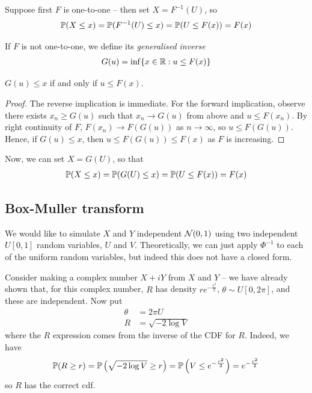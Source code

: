 \documentclass{../template/note}
\begin{document}
    Suppose first \(F\) is one-to-one -- then set \(X = F^{-1}(U)\), so
    \begin{align*}
        \mathbb P(X \leq x) = \mathbb P(F^{-1}(U) \leq x) = \mathbb P(U \leq F(x)) = F(x)
    \end{align*}
    
    If \(F\) is not one-to-one, we define its \emph{generalised inverse}
    \begin{align*}
        G(u) = \inf\{x \in \mathbb R: u \leq F(x)\}
    \end{align*}
    
    \begin{lemma}
        \(G(u) \leq x\) if and only if \(u \leq F(x)\).
    \end{lemma}
    
    \begin{proof}
        The reverse implication is immediate. For the forward implication, observe there exists \(x_n \geq G(u)\) such that \(x_n \to G(u)\) from above and \(u \leq F(x_n)\). By right continuity of \(F\), \(F(x_n) \to F(G(u))\) as \(n \to \infty\), so \(u \leq F(G(u))\). Hence, if \(G(u) \leq x\), then \(u \leq F(G(u)) \leq F(x)\) as \(F\) is increasing.
    \end{proof}
    
    Now, we can set \(X = G(U)\), so that
    \begin{align*}
        \mathbb P(X \leq x) = \mathbb P(G(U) \leq x) = \mathbb P(U \leq F(x)) = F(x)
    \end{align*}

    \subsection{Box-Muller transform}

    We would like to simulate \(X\) and \(Y\) independent \(\mathcal{N}(0, 1)\) using two independent \(U[0, 1]\) random variables, \(U\) and \(V\). Theoretically, we can just apply \(\Phi^{-1}\) to each of the uniform random variables, but indeed this does not have a closed form.

    Consider making a complex number \(X+iY\) from \(X\) and \(Y\) -- we have already shown that, for this complex number, \(R\) has density \(re^{-\frac{r^2}{2}}\), \(\theta \sim U[0, 2\pi]\), and these are independent. Now put
    \begin{align*}
        \theta &= 2\pi U \\
        R &= \sqrt{-2 \log V}
    \end{align*}
    where the \(R\) expression comes from the inverse of the CDF for \(R\). Indeed, we have
    \begin{align*}
        \mathbb P(R \geq r) = \mathbb P\left(\sqrt{-2\log V} \geq r\right) = \mathbb P\left(V \leq e^{-\frac{r^2}2}\right) = e^{-\frac{r^2}{2}}
    \end{align*}
    so \(R\) has the correct cdf.
\end{document}
